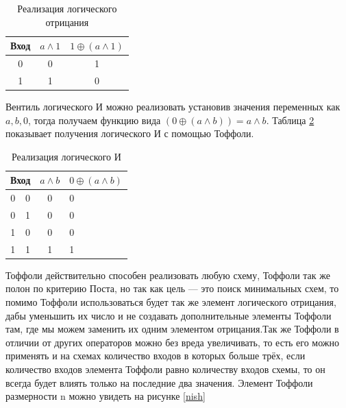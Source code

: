 \documentclass[14pt]{extarticle} %
\begin{document}
\begin{table}[h]
	\begin{center}
	\caption{Реализация логического отрицания}
	\label{tab:not}
	\begin{tabular}{|cl|c|c|}
		\hline
		\multicolumn{2}{|c|}{Вход} & $a \wedge 1$ & $1\oplus (a\wedge 1)$ \\ \hline
		\multicolumn{2}{|c|}{0}    & 0  & 1   \\ \hline
		\multicolumn{2}{|c|}{1}    & 1  & 0   \\ \hline
	\end{tabular}
\end{center}
\end{table}

 Вентиль логического И можно реализовать установив значения переменных как ${a,b,0}$, тогда получаем функцию вида  $(0\oplus(a \wedge b))= a\wedge b$. Таблица  \ref{tab:and} показывает получения логического И с помощью Тоффоли.
 
 \begin{table}[h]
 	\begin{center}

 	
 	\caption{Реализация логического И}
 	\label{tab:and}
 	\begin{tabular}{|cc|c|l|}
 		\hline
 		\multicolumn{2}{|c|}{Вход}  & $a\wedge b$ & $0\oplus (a\wedge b)$ \\ \hline
 		\multicolumn{1}{|c|}{0} & 0 & 0                        & 0                                                 \\ \hline
 		\multicolumn{1}{|c|}{0} & 1 & 0                        & 0                                                 \\ \hline
 		\multicolumn{1}{|c|}{1} & 0 & 0                        & 0                                                 \\ \hline
 		\multicolumn{1}{|c|}{1} & 1 & 1                        & 1                                                 \\ \hline
 	\end{tabular}
\end{center}
 \end{table}

Тоффоли действительно способен реализовать любую схему, Тоффоли так же полон по критерию Поста, но так как цель --- это поиск минимальных схем, то помимо Тоффоли использоваться будет так же элемент логического отрицания, дабы уменьшить их число и не создавать дополнительные элементы Тоффоли там, где мы можем заменить их одним элементом отрицания.Так же Тоффоли в отличии от других операторов можно без вреда увеличивать, то есть его можно применять и на схемах количество входов в которых больше трёх, если количество входов элемента Тоффоли равно количеству входов схемы, то он всегда будет влиять только на последние два значения. Элемент Тоффоли размерности n можно увидеть на рисунке \ref{nish}
\end{document}
